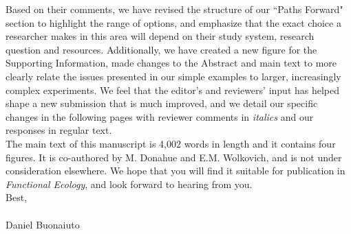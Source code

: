 \documentclass[11 pt]{article}
\begin{document}
\noindent Based on their comments, we have revised the structure of our ``Paths Forward" section to highlight the range of options, and emphasize that the exact choice a researcher makes in this area will depend on their study system, research question and resources. Additionally, %
we have created a new figure for the Supporting Information, made changes to the Abstract and main text to more clearly relate the issues presented in our simple examples to larger, increasingly complex experiments. We feel that the editor's and reviewers' input has helped shape a new submission that is much improved, and we detail our specific changes in the following pages with reviewer comments in \emph{italics} and our responses in regular text.\\

\noindent The main text of this manuscript is 4,002 words in length and it contains four figures. It is co-authored by M. Donahue and E.M. Wolkovich, and is not under consideration elsewhere. We hope that you will find it suitable for publication in \textit{Functional Ecology}, and look forward to hearing from you.\\


\noindent Best,\\
\\



\noindent Daniel Buonaiuto
\end{document}
